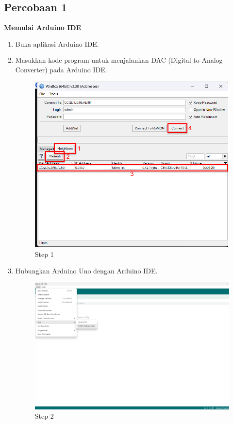 \subsection{Percobaan 1}
\begin{center}
	\textbf{Memulai Arduino IDE}
    \begin{enumerate}
        \item Buka aplikasi Arduino IDE.
        \item Masukkan kode program untuk menjalankan DAC (Digital to Analog Converter) pada Arduino IDE.
        \begin{figure}[H]
			\centering
			\includegraphics[width=0.8\linewidth]{P3/img/step 1.png}
			\caption{Step 1}
			\label{fig:Step 1}
		\end{figure}
		\item Hubungkan Arduino Uno dengan Arduino IDE.
        \begin{figure}[H]
			\centering
			\includegraphics[width=0.8\linewidth]{P3/img/step 2.png}
			\caption{Step 2}
			\label{fig:Step 2}
		\end{figure}

\end{enumerate}
\end{center}
